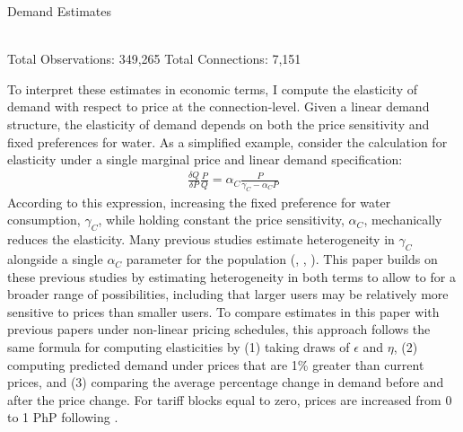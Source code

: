 \documentclass[12pt]{article}
\begin{document}
\begin{table}
\centering
\caption{Demand Estimates}\label{table:demandestimates}
 \\
\vspace{.1cm}
{\footnotesize{Total Observations:  349,265   Total Connections:  7,151} }
\end{table}
To interpret these estimates in economic terms, I compute the elasticity of demand with respect to price at the connection-level.  Given a linear demand structure, the elasticity of demand depends on both the price sensitivity and fixed preferences for water.  As a simplified example, consider the calculation for elasticity under a single marginal price and linear demand specification:
\begin{align*}
\frac{\delta Q}{\delta P} \frac{P}{Q} = \alpha_{C} \frac{P}{\gamma_{C}-\alpha_{C} P}
\end{align*}
According to this expression, increasing the fixed preference for water consumption, $\gamma_C$, while holding constant the price sensitivity, $\alpha_C$, mechanically reduces the elasticity.  Many previous studies estimate heterogeneity in $\gamma_C$ alongside a single $\alpha_C$ parameter for the population (\cite{mcrae2014infrastructure}, \cite{olmstead2009reduced}, \cite{szabo2015value}).  This paper builds on these previous studies by estimating heterogeneity in both terms to allow to for a broader range of possibilities, including that larger users may be relatively more sensitive to prices than smaller users.  To compare estimates in this paper with previous papers under non-linear pricing schedules, this approach follows the same formula for computing elasticities by (1) taking draws of $\epsilon$ and $\eta$, (2) computing predicted demand under prices that are 1\% greater than current prices, and (3) comparing the average percentage change in demand before and after the price change.  For tariff blocks equal to zero, prices are increased from 0 to 1 PhP following \cite{szabo2015value}. 
\end{document}

